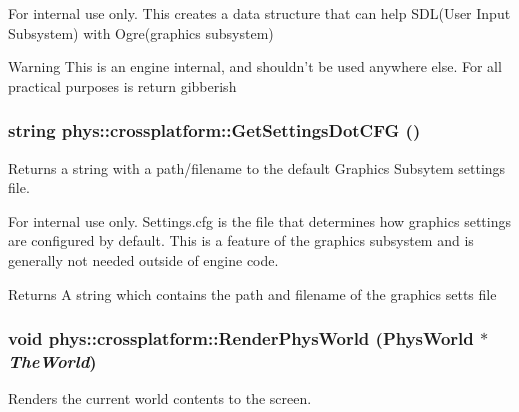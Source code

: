 \begin{DoxyInternal}{For internal use only.}
This creates a data structure that can help SDL(User Input Subsystem) with Ogre(graphics subsystem) \begin{DoxyWarning}{Warning}
This is an engine internal, and shouldn't be used anywhere else. For all practical purposes is return gibberish 
\end{DoxyWarning}
\end{DoxyInternal}
\hypertarget{namespacephys_1_1crossplatform_a2d43f3aa5a485564c3f375b36a08152f}{
\subsubsection[{GetSettingsDotCFG}]{\setlength{\rightskip}{0pt plus 5cm}string phys::crossplatform::GetSettingsDotCFG ()}}
\label{d4/d59/namespacephys_1_1crossplatform_a2d43f3aa5a485564c3f375b36a08152f}


Returns a string with a path/filename to the default Graphics Subsytem settings file. 

\begin{DoxyInternal}{For internal use only.}
Settings.cfg is the file that determines how graphics settings are configured by default. This is a feature of the graphics subsystem and is generally not needed outside of engine code. \begin{DoxyReturn}{Returns}
A string which contains the path and filename of the graphics setts file 
\end{DoxyReturn}
\end{DoxyInternal}
\hypertarget{namespacephys_1_1crossplatform_a2025b17e592096a6fbb6d24619138c71}{
\subsubsection[{RenderPhysWorld}]{\setlength{\rightskip}{0pt plus 5cm}void phys::crossplatform::RenderPhysWorld ({\bf PhysWorld} $\ast$ {\em TheWorld})}}
\label{d4/d59/namespacephys_1_1crossplatform_a2025b17e592096a6fbb6d24619138c71}


Renders the current world contents to the screen. 

